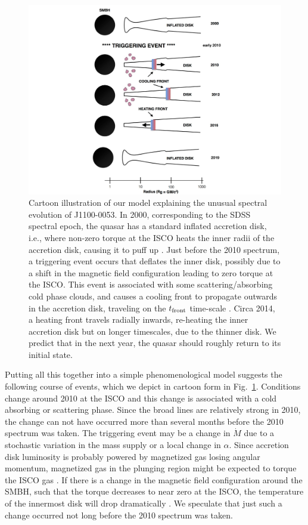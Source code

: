 \documentclass[a4paper,fleqn,usenatbib]{mnras}
\begin{document}
\begin{figure}
  \includegraphics[width=15.4cm, trim=0.0cm 0.0cm 0.0cm 0.0cm, clip]
  {cartoon_v4.pdf}
  \centering
  \caption[]{
    Cartoon illustration of our model explaining the unusual spectral
evolution of J1100-0053. In 2000, corresponding to the SDSS spectral
epoch, the quasar has a standard inflated accretion disk, i.e., where
non-zero torque at the ISCO heats the inner radii of the accretion
disk, causing it to puff up \citep[e.g.,][]{Zimmerman2005}. Just
before the 2010 spectrum, a triggering event occurs that deflates the
inner disk, possibly due to a shift in the magnetic field
configuration leading to zero torque at the ISCO.  This event is
associated with some scattering/absorbing cold phase clouds, and
causes a cooling front to propagate outwards in the accretion disk,
traveling on the $t_{\rm front}$ time-scale \citep[see
also][]{Hameury2009}.  Circa 2014, a heating front travels radially
inwards, re-heating the inner accretion disk but on longer timescales,
due to the thinner disk. We predict that in the next year, the quasar
should roughly return to its initial state.}
  \label{fig:J110057_cartoon}
\end{figure}
Putting all this together into a simple phenomenological model
suggests the following course of events, which we depict in cartoon
form in Fig.~\ref{fig:J110057_cartoon}.  Conditions change around 2010
at the ISCO and this change is associated with a cold absorbing or
scattering phase. Since the broad lines are relatively strong in 2010,
the change can not have occurred more than several months before the
2010 spectrum was taken. The triggering event may be a change in
$\dot{M}$ due to a stochastic variation in the mass supply or a local
change in $\alpha$. Since accretion disk luminosity is probably
powered by magnetized gas losing angular momentum, magnetized gas in
the plunging region might be expected to torque the ISCO gas
\citep[e.g., ][]{Gammie1999, Agol_Krolik2000}. If there is a change in
the magnetic field configuration around the SMBH, such that the torque
decreases to near zero at the ISCO, the temperature of the innermost disk will
drop dramatically \citep{Cao2003}.  We speculate that just such a
change occurred not long before the 2010 spectrum was taken.
\end{document}
